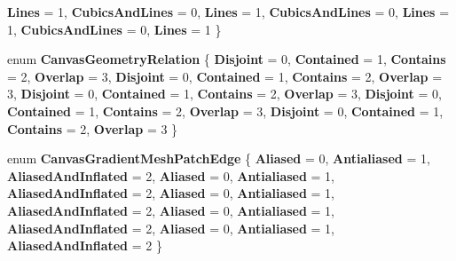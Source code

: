 \begin{DoxyCompactItemize}
{\bfseries Lines} = 1, 
\newline
{\bfseries Cubics\+And\+Lines} = 0, 
{\bfseries Lines} = 1, 
{\bfseries Cubics\+And\+Lines} = 0, 
{\bfseries Lines} = 1, 
\newline
{\bfseries Cubics\+And\+Lines} = 0, 
{\bfseries Lines} = 1
 \}
\item 
\mbox{\label{namespace_microsoft_1_1_graphics_1_1_canvas_1_1_geometry_abb27c8fb8d2b8f00eb3225ac6f3531e3}} 
enum {\bfseries Canvas\+Geometry\+Relation} \{ \newline
{\bfseries Disjoint} = 0, 
{\bfseries Contained} = 1, 
{\bfseries Contains} = 2, 
{\bfseries Overlap} = 3, 
\newline
{\bfseries Disjoint} = 0, 
{\bfseries Contained} = 1, 
{\bfseries Contains} = 2, 
{\bfseries Overlap} = 3, 
\newline
{\bfseries Disjoint} = 0, 
{\bfseries Contained} = 1, 
{\bfseries Contains} = 2, 
{\bfseries Overlap} = 3, 
\newline
{\bfseries Disjoint} = 0, 
{\bfseries Contained} = 1, 
{\bfseries Contains} = 2, 
{\bfseries Overlap} = 3, 
\newline
{\bfseries Disjoint} = 0, 
{\bfseries Contained} = 1, 
{\bfseries Contains} = 2, 
{\bfseries Overlap} = 3
 \}
\item 
\mbox{\label{namespace_microsoft_1_1_graphics_1_1_canvas_1_1_geometry_ad355c607a325a3422031f9e574b3dd1b}} 
enum {\bfseries Canvas\+Gradient\+Mesh\+Patch\+Edge} \{ \newline
{\bfseries Aliased} = 0, 
{\bfseries Antialiased} = 1, 
{\bfseries Aliased\+And\+Inflated} = 2, 
{\bfseries Aliased} = 0, 
\newline
{\bfseries Antialiased} = 1, 
{\bfseries Aliased\+And\+Inflated} = 2, 
{\bfseries Aliased} = 0, 
{\bfseries Antialiased} = 1, 
\newline
{\bfseries Aliased\+And\+Inflated} = 2, 
{\bfseries Aliased} = 0, 
{\bfseries Antialiased} = 1, 
{\bfseries Aliased\+And\+Inflated} = 2, 
\newline
{\bfseries Aliased} = 0, 
{\bfseries Antialiased} = 1, 
{\bfseries Aliased\+And\+Inflated} = 2
 \}
\item 
\mbox{\label{namespace_microsoft_1_1_graphics_1_1_canvas_1_1_geometry_aceede6fdba7f9ce2af9afb615db0aebf}} 

\end{DoxyCompactItemize}
